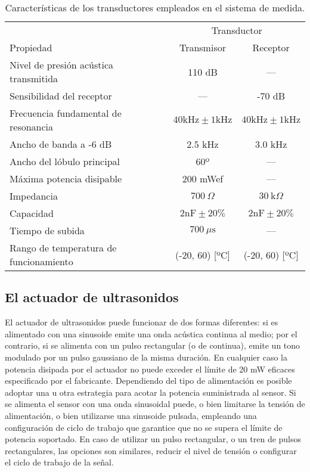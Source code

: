 \begin{sidewaystable}
	\centering
	\begin{threeparttable}
	\begin{tabular}{l c c}
		\toprule
		& \multicolumn{2}{c}{Transductor} \\
		\cmidrule(l){2-3}
		Propiedad & Transmisor & Receptor \\
		\midrule
		Nivel de presión acústica transmitida & 110 dB & --- \\
		Sensibilidad del receptor & --- & -70 dB \\
		Frecuencia fundamental de resonancia
		& $40 \text{kHz} \pm 1 \text{kHz}$
		& $40 \text{kHz} \pm 1 \text{kHz}$ \\
		Ancho de banda a -6 dB & $2.5$ kHz & $3.0$ kHz \\
		Ancho del lóbulo principal & 60º & --- \\
		Máxima potencia disipable & 200 mWef & --- \\
		Impedancia & $700\ \Omega$ & $30\ \text{k}\Omega$ \\
		Capacidad & $2 \text{nF} \pm 20\%$
		& $2 \text{nF} \pm 20\%$ \\
		Tiempo de subida & $700\ \mu\text{s}$ & --- \\
		Rango de temperatura de funcionamiento %
		& (-20, 60) [ºC] & (-20, 60) [ºC] \\
		\bottomrule
	\end{tabular}
	\begin{TableNotes}
	\end{TableNotes}
	\end{threeparttable}
	\caption[Características de los transductores]{Características de
	los transductores empleados en el sistema de medida.}
	\label{tab:transducers}
\end{sidewaystable}


\subsection{El actuador de ultrasonidos}

El actuador de ultrasonidos puede funcionar de dos formas diferentes: si es
alimentado con una sinusoide emite una onda acústica continua al medio; por
el contrario, si se alimenta con un pulso rectangular (o de continua),
emite un tono modulado por un pulso gaussiano de la misma duración. En
cualquier caso la potencia disipada por el actuador no puede exceder el
límite de 20 mW eficaces especificado por el fabricante. Dependiendo del
tipo de alimentación es posible adoptar una u otra estrategia para acotar
la potencia suministrada al sensor. Si se alimenta el sensor con una onda
sinusoidal puede, o bien limitarse la tensión de alimentación, o bien
utilizarse una sinusoide pulsada, empleando una configuración de ciclo de
trabajo que garantice que no se supera el límite de potencia soportado. En
caso de utilizar un pulso rectangular, o un tren de pulsos rectangulares,
las opciones son similares, reducir el nivel de tensión o configurar el
ciclo de trabajo de la señal.

